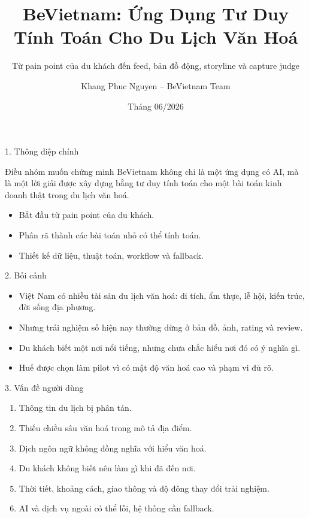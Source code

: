 \documentclass[aspectratio=169]{beamer}
\title[BeVietnam]{BeVietnam: Ứng Dụng Tư Duy Tính Toán Cho Du Lịch Văn Hoá}
\subtitle{Từ pain point của du khách đến feed, bản đồ động, storyline và capture judge}
\author{Khang Phuc Nguyen -- BeVietnam Team}
\institute{Môn học Tư duy tính toán \\ HCMUS -- VNUHCM}
\date{Tháng 06/2026}
\begin{document}
\begin{frame}
  \titlepage
\end{frame}

\begin{frame}{1. Thông điệp chính}
\begin{block}{Điều nhóm muốn chứng minh}
BeVietnam không chỉ là một ứng dụng có AI, mà là một lời giải được xây dựng bằng tư duy tính toán cho một bài toán kinh doanh thật trong du lịch văn hoá.
\end{block}
\begin{itemize}
    \item Bắt đầu từ pain point của du khách.
    \item Phân rã thành các bài toán nhỏ có thể tính toán.
    \item Thiết kế dữ liệu, thuật toán, workflow và fallback.
\end{itemize}
\end{frame}

\begin{frame}{2. Bối cảnh}
\begin{itemize}
    \item Việt Nam có nhiều tài sản du lịch văn hoá: di tích, ẩm thực, lễ hội, kiến trúc, đời sống địa phương.
    \item Nhưng trải nghiệm số hiện nay thường dừng ở bản đồ, ảnh, rating và review.
    \item Du khách biết một nơi nổi tiếng, nhưng chưa chắc hiểu nơi đó có ý nghĩa gì.
    \item Huế được chọn làm pilot vì có mật độ văn hoá cao và phạm vi đủ rõ.
\end{itemize}
\end{frame}

\begin{frame}{3. Vấn đề người dùng}
\begin{enumerate}
    \item Thông tin du lịch bị phân tán.
    \item Thiếu chiều sâu văn hoá trong mô tả địa điểm.
    \item Dịch ngôn ngữ không đồng nghĩa với hiểu văn hoá.
    \item Du khách không biết nên làm gì khi đã đến nơi.
    \item Thời tiết, khoảng cách, giao thông và độ đông thay đổi trải nghiệm.
    \item AI và dịch vụ ngoài có thể lỗi, hệ thống cần fallback.
\end{enumerate}
\end{frame}
\end{document}
